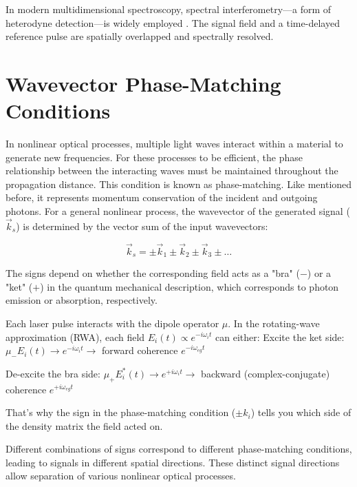 \noindent In modern multidimensional spectroscopy, spectral interferometry—a form of heterodyne detection—is widely employed \cite{hybletal1998twodimensionalelectronicspectroscopy}. The signal field and a time-delayed reference pulse are spatially overlapped and spectrally resolved.

\section{Wavevector Phase-Matching Conditions}
\label{sec:phase_matching}

\noindent 
In nonlinear optical processes, multiple light waves interact within a material to generate new frequencies. For these processes to be efficient, the phase relationship between the interacting waves must be maintained throughout the propagation distance. This condition is known as phase-matching.
\noindent 
Like mentioned before, it represents momentum conservation of the incident and outgoing photons. For a general nonlinear process, the wavevector of the generated signal ($\vec{k}_s$) is determined by the vector sum of the input wavevectors:

\begin{equation}
	\vec{k}_s = \pm\vec{k}_1 \pm\vec{k}_2 \pm\vec{k}_3 \pm \ldots
	\label{eq:phase_matching}
\end{equation}

\noindent 
The signs depend on whether the corresponding field acts as a "bra" ($-$) or a "ket" ($+$) in the quantum mechanical description, which corresponds to photon emission or absorption, respectively.

Each laser pulse interacts with the dipole operator $\mu$.
In the rotating-wave approximation (RWA), each field $E_i(t) \propto e^{-i\omega_i t}$ can either:
Excite the ket side: $\mu_{-} E_i(t) \rightarrow e^{-i\omega_i t} \rightarrow$ forward coherence $e^{-i\omega_{eg} t}$

De-excite the bra side: $\mu_{+} E_i^{*}(t) \rightarrow e^{+i\omega_i t} \rightarrow$ backward (complex-conjugate) coherence $e^{+i\omega_{eg} t}$

That's why the sign in the phase-matching condition ($\pm k_i$) tells you which side of the density matrix the field acted on.

\noindent 
Different combinations of signs correspond to different phase-matching conditions, leading to signals in different spatial directions. These distinct signal directions allow separation of various nonlinear optical processes.


